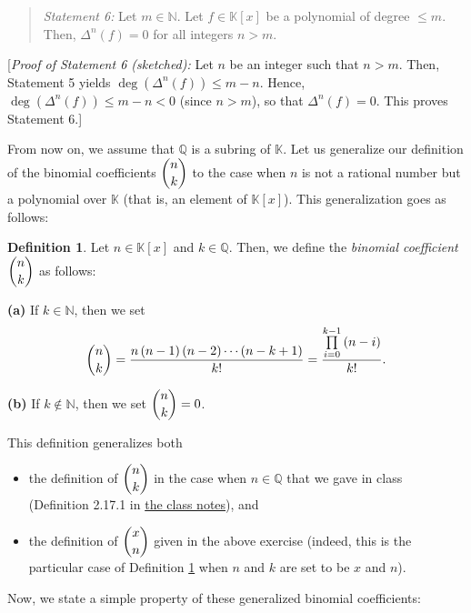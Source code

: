 \documentclass[paper=a4, fontsize=12pt]{scrartcl}%
\let\prodnonlimits\prod
\renewcommand{\prod}{\prodnonlimits\limits}
\theoremstyle{plainsl}
\theoremstyle{definition}
\newtheorem{definition}[theorem]{Definition}
\theoremstyle{remark}
\newenvironment{statement}{\begin{quote}}{\end{quote}}
\begin{document}
\begin{statement}
\textit{Statement 6:} Let $m\in\mathbb{N}$. Let $f\in\mathbb{K}\left[
x\right]  $ be a polynomial of degree $\leq m$. Then, $\Delta^{n}\left(
f\right)  =0$ for all integers $n>m$.
\end{statement}

[\textit{Proof of Statement 6 (sketched):} Let $n$ be an integer such that
$n>m$. Then, Statement 5 yields $\deg\left(  \Delta^{n}\left(  f\right)
\right)  \leq m-n$. Hence, $\deg\left(  \Delta^{n}\left(  f\right)  \right)
\leq m-n<0$ (since $n>m$), so that $\Delta^{n}\left(  f\right)  =0$. This
proves Statement 6.]

\bigskip

From now on, we assume that $\mathbb{Q}$ is a subring of $\mathbb{K}$. Let us
generalize our definition of the binomial coefficients $\dbinom{n}{k}$ to the
case when $n$ is not a rational number but a polynomial over $\mathbb{K}$
(that is, an element of $\mathbb{K}\left[  x\right]  $). This generalization
goes as follows:

\begin{definition}
\label{def.pol.general-binom}Let $n\in\mathbb{\mathbb{K}}\left[  x\right]  $
and $k\in\mathbb{Q}$. Then, we define the \textit{binomial coefficient}
$\dbinom{n}{k}$ as follows:

\textbf{(a)} If $k\in\mathbb{N}$, then we set
\[
\dbinom{n}{k}=\dfrac{n\left(  n-1\right)  \left(  n-2\right)  \cdots\left(
n-k+1\right)  }{k!}=\dfrac{\prod_{i=0}^{k-1}\left(  n-i\right)  }{k!}.
\]


\textbf{(b)} If $k\notin\mathbb{N}$, then we set $\dbinom{n}{k}=0$.
\end{definition}

This definition generalizes both

\begin{itemize}
\item the definition of $\dbinom{n}{k}$ in the case when $n\in\mathbb{Q}$ that
we gave in class (Definition 2.17.1 in
\href{http://www.cip.ifi.lmu.de/~grinberg/t/19s/notes.pdf}{the class notes}), and

\item the definition of $\dbinom{x}{n}$ given in the above exercise (indeed,
this is the particular case of Definition \ref{def.pol.general-binom} when $n$
and $k$ are set to be $x$ and $n$).
\end{itemize}

Now, we state a simple property of these generalized binomial coefficients:
\end{document}
